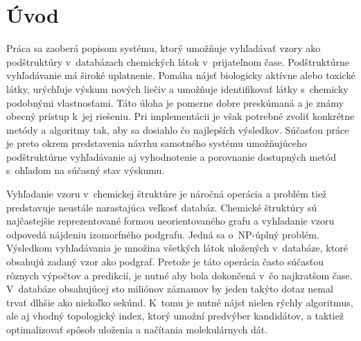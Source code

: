 \documentclass[slovak]{ExcelAtFIT} %
\affiliation{*%
  \href{mailto:xsevci50@stud.fit.vutbr.cz}{xsevci50@stud.fit.vutbr.cz},
  \textit{Faculty of Information Technology, Brno University of Technology}}
\begin{document}
\startdocument



\section{Úvod}
Práca sa zaoberá popisom systému, ktorý umožňuje vyhľadávať vzory ako podštruktúry v~databázach chemických látok v~prijateľnom čase. Podštruktúrne vy\-hľa\-dá\-va\-nie má široké uplatnenie. Pomáha nájsť biologicky aktívne alebo toxické látky, urýchľuje výskum nových liečiv a umožňuje identifikovať látky s~chemicky podobnými vlastnosťami. Táto úloha je pomerne dobre preskúmaná a je známy obecný prístup k~jej riešeniu. Pri implementácii je však potrebné zvoliť konkrétne metódy a algoritmy tak, aby sa dosiahlo čo najlepších výsledkov. Súčasťou práce je preto okrem predstavenia návrhu samotného systému umožňujúceho podštruktúrne vy\-hľa\-dá\-va\-nie aj vyhodnotenie a porovnanie dostupných metód s~ohľadom na súčasný stav výskumu.

Vyhľadanie vzoru v~chemickej štruktúre je náročná operácia a problém tiež predstavuje neustále narastajúca veľkosť databáz. Chemické štruktúry sú naj\-čas\-tej\-šie reprezentované formou neorientovaného grafu a vyhľadanie vzoru odpovedá nájdeniu izomorfného podgrafu. Jedná sa o~NP-úplný problém. Výsledkom vyhľadávania je množina všetkých látok uložených v~databáze, ktoré obsahujú zadaný vzor ako podgraf. Pretože je táto operácia často súčasťou rôznych vý\-poč\-tov a predikcií, je nutné aby bola dokončená v~čo najkratšom čase. V~databáze obsahujúcej sto miliónov záznamov by jeden takýto dotaz nemal trvať dlhšie ako niekoľko sekúnd. K~tomu je nutné nájsť nielen rýchly algoritmus, ale aj vhodný topologický index, ktorý umožní predvýber kandidátov, a taktiež optimalizovať spôsob uloženia a načítania molekulárnych dát.
\end{document}
